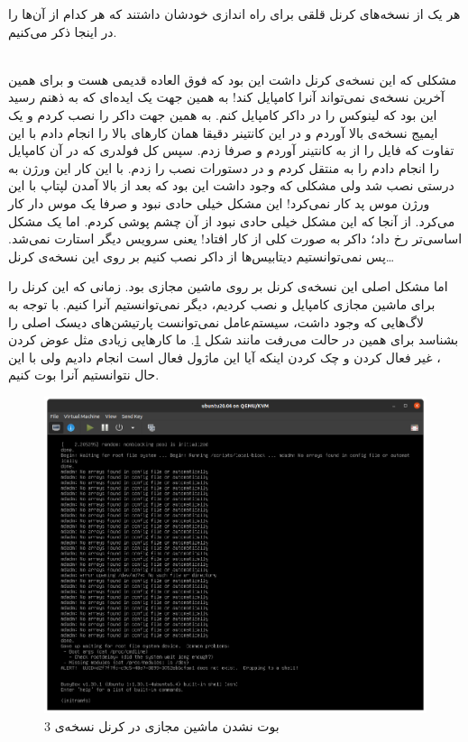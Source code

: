 هر یک از نسخه‌های کرنل قلقی برای راه اندازی خودشان داشتند که هر کدام از آن‌ها را در اینجا
ذکر می‌کنیم.

\\\noindent
مشکلی که این نسخه‌ی کرنل داشت این بود که فوق العاده قدیمی هست و برای همین آخرین نسخه‌ی
نمی‌تواند آنرا کامپایل کند! به همین جهت یک ایده‌ای که به ذهنم رسید این بود که لینوکس را در داکر
کامپایل کنم. به همین جهت داکر را نصب کردم و یک ایمیج نسخه‌ی
بالا آوردم و در این کانتینر دقیقا همان کار‌های بالا را انجام دادم با این تفاوت که فایل
را از
به کانتینر آوردم و صرفا
زدم. سپس کل فولدری که در آن کامپایل را انجام دادم را به
منتقل کردم و در
دستورات نصب را زدم. با این کار این ورژن به درستی نصب شد ولی مشکلی که وجود داشت این بود که
بعد از بالا آمدن لپتاپ با این ورژن موس پد کار نمی‌کرد! این مشکل خیلی حادی نبود و صرفا یک موس
دار کار می‌کرد. از آنجا که این مشکل خیلی حادی نبود از آن چشم پوشی کردم. اما یک مشکل اساسی‌تر رخ داد؛
داکر به صورت کلی از کار افتاد! یعنی سرویس
دیگر استارت نمی‌شد. پس نمی‌توانستیم دیتابیس‌ها از داکر نصب کنیم بر روی این نسخه‌ی کرنل\dots

اما مشکل اصلی این نسخه‌ی کرنل بر روی ماشین مجازی بود. زمانی که این کرنل را برای ماشین مجازی کامپایل
و نصب کردیم، دیگر نمی‌توانستیم آنرا
کنیم. با توجه به لاگ‌هایی که وجود داشت،‌ سیستم‌عامل نمی‌توانست پارتیشن‌های دیسک اصلی را بشناسد برای همین در
حالت
می‌رفت مانند شکل
\ref{fig:into:kernel:vm3}.
ما کار‌هایی زیادی مثل عوض کردن
،‌
غیر فعال کردن
 و
چک کردن اینکه آیا این ماژول فعال است انجام دادیم ولی با این حال نتوانستیم آنرا بوت کنیم.
\begin{figure}[H]
    \centering
    \includegraphics[scale=0.3]{pictures/intro/kvm-kernel-3.png}
    \caption{بوت نشدن ماشین مجازی در کرنل نسخه‌ی 3}
    \label{fig:into:kernel:vm3}
\end{figure}

